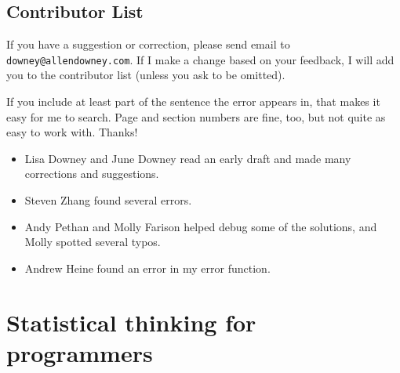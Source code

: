 \documentclass[12pt]{book}
\begin{document}



\section*{Contributor List}


If you have a suggestion or correction, please send email to 
{\tt downey@allendowney.com}.  If I make a change based on your
feedback, I will add you to the contributor list
(unless you ask to be omitted).

If you include at least part of the sentence the
error appears in, that makes it easy for me to search.  Page and
section numbers are fine, too, but not quite as easy to work with.
Thanks!

\small

\begin{itemize}

\item Lisa Downey and June Downey read an early draft and made many
corrections and suggestions.

\item Steven Zhang found several errors.

\item Andy Pethan and Molly Farison helped debug some of the solutions,
and Molly spotted several typos.

\item Andrew Heine found an error in my error function.


\end{itemize}

\normalsize

\clearemptydoublepage

\begin{latexonly}

\tableofcontents

\clearemptydoublepage

\end{latexonly}

\mainmatter


\chapter{Statistical thinking for programmers}
\label{intro}
\end{document}
